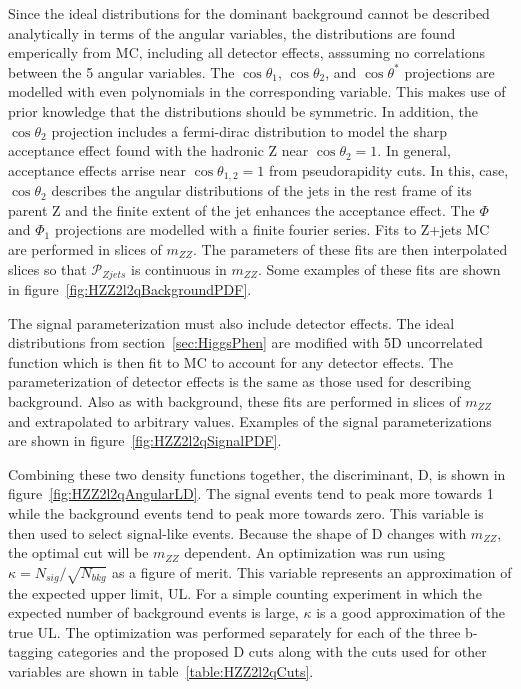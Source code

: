 Since the ideal distributions for the dominant background 
cannot be described analytically in terms of the angular variables, 
the distributions are found 
emperically from MC, including all detector effects, 
 asssuming no correlations between 
the 5 angular variables.  The $\cos\theta_1$, $\cos\theta_2$, 
and $\cos\theta^*$ projections are modelled with even polynomials
in the corresponding variable.  This makes use of prior knowledge
that the distributions should be symmetric.  In addition, 
the $\cos\theta_2$ projection includes a fermi-dirac distribution
to model the sharp acceptance effect found with the hadronic
Z near $\cos\theta_2=1$.  In general, acceptance effects arrise
near $\cos\theta_{1,2}=1$ from pseudorapidity cuts.  In this, 
case, $\cos\theta_2$ describes the angular distributions of the
jets in the rest frame of its parent Z and the finite extent of
the jet enhances the acceptance effect.  The $\Phi$ and $\Phi_1$
projections are modelled with a finite fourier series.
Fits to Z+jets MC are performed in slices of $m_{ZZ}$.  The 
parameters of these fits are then interpolated slices so
that $\mathscr{P}_{Zjets}$ is continuous in $m_{ZZ}$.  
Some examples of these fits are shown in
figure~\ref{fig:HZZ2l2qBackgroundPDF}.  

The signal parameterization must also include detector effects.
The ideal distributions from section~\ref{sec:HiggsPhen} are 
modified with 5D uncorrelated function which is then fit to 
MC to account for any detector effects.  The parameterization 
of detector effects is the same as those used for describing
background. Also as with background, these fits are performed
in slices of $m_{ZZ}$ and extrapolated to arbitrary values.
Examples of the signal parameterizations are shown in
figure~\ref{fig:HZZ2l2qSignalPDF}.  

Combining these two density
functions together, the discriminant, D, is shown in
figure~\ref{fig:HZZ2l2qAngularLD}.  The signal events tend to
peak more towards 1 while the background events tend to peak
more towards zero.  This variable is then used to select 
signal-like events.
Because the shape of D changes with $m_{ZZ}$, the optimal cut will 
be $m_{ZZ}$ dependent. An optimization was run using
$\kappa=N_{sig}/\sqrt{N_{bkg}}$ as a figure of merit.  This variable
represents an approximation of the expected upper limit, UL.  For
a simple counting experiment in which the 
expected number of background events is large, $\kappa$ is a good
approximation of the true UL.  The optimization was performed 
separately for each of the three b-tagging categories and the
proposed D cuts along with the cuts used for other variables
are shown in table~\ref{table:HZZ2l2qCuts}.

